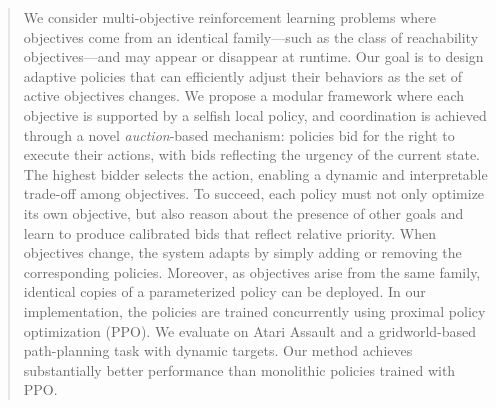 \begin{abstract}
We consider multi-objective reinforcement learning problems where objectives come from an identical family---such as the class of reachability objectives---and may appear or disappear at runtime.
Our goal is to design adaptive policies that can efficiently adjust their behaviors as the set of active objectives changes.
We propose a modular framework where each objective is supported by a selfish local policy, and coordination is achieved through a novel \emph{auction}-based mechanism:
policies bid for the right to execute their actions, with bids reflecting the urgency of the current state.
The highest bidder selects the action, enabling a dynamic and interpretable trade-off among objectives.
To succeed, each policy must not only optimize its own objective, but also reason about the presence of other goals and learn to produce calibrated bids that reflect relative priority.
When objectives change, the system adapts by simply adding or removing the corresponding policies.
Moreover, as objectives arise from the same family, identical copies of a parameterized policy can be deployed.
In our implementation, the policies are trained concurrently using proximal policy optimization (PPO).
We evaluate on Atari Assault and a gridworld-based path-planning task with dynamic targets.
Our method achieves substantially better performance than monolithic policies trained with PPO. 
\end{abstract}